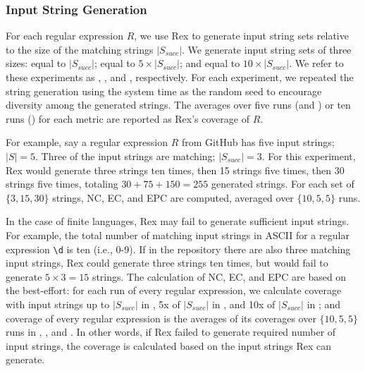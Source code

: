 \subsubsection{Input String Generation}
For each regular expression $R$, we use Rex to generate input string sets relative to the size of the matching strings $\lvert S_{succ} \rvert$. 
We generate input string sets of three sizes: equal to $\lvert S_{succ} \rvert$; equal to $5 \times \lvert S_{succ} \rvert$; and equal to $10 \times \lvert S_{succ} \rvert$. We refer to these experiments as \RexSOne, \RexSFive, and \RexSTen, respectively. For each experiment, we repeated the string generation using the system time as the random seed to encourage diversity among the generated strings. The averages over five runs (\RexSFive and \RexSTen) or ten runs (\RexSOne) for each metric are reported as Rex's coverage of $R$. 

For example, say a regular expression $R$ from GitHub has five input strings; $\lvert S \rvert = 5$. Three of the input strings are matching; $\lvert S_{succ} \rvert = 3$. For this experiment, Rex would generate three strings ten times, then 15 strings five times, then 30 strings five times, totaling $30 + 75 + 150 = 255$ generated strings. For each set of $\{3, 15, 30\}$ strings, NC, EC, and EPC are computed, averaged over $\{10,5,5\}$ runs. %

In the case of finite languages, Rex may fail to generate sufficient input strings. For example, the total number of matching input strings in ASCII for a regular expression \verb!\d! is ten (i.e., 0-9). If in the repository there are also three matching input strings, Rex could generate three strings ten times, but would fail to generate $5 \times 3 = 15$ strings. %
The calculation of NC, EC, and EPC are based on the best-effort: for each run of every regular expression, we calculate coverage with input strings up to $\lvert S_{succ} \rvert$ in \RexSOne, 5x of $\lvert S_{succ} \rvert$ in \RexSFive, and 10x of $\lvert S_{succ} \rvert$ in \RexSTen; and coverage of every regular expression is the averages of its coverages over $\{10,5,5\}$ runs in \RexSOne, \RexSFive, and \RexSTen. In other words, if Rex failed to generate required number of input strings, the coverage is calculated based on the input strings Rex can generate.

